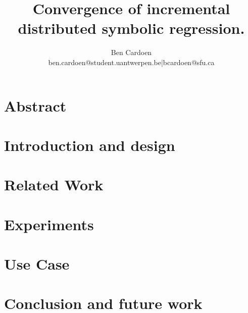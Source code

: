 \documentclass[twocolumn]{article}
\title{Convergence of incremental distributed symbolic regression.
    }
\author{
    Ben Cardoen  \\
    {ben.cardoen@student.uantwerpen.be|bcardoen@sfu.ca}
}
\date{}
\begin{document}
    
    \maketitle
    \section{Abstract}
    
    \section{Introduction and design}
    
    \section{Related Work}
    
    \section{Experiments}
    
    \section{Use Case}
    
    \section{Conclusion and future work}
    
%    
    
    
    
\end{document}
